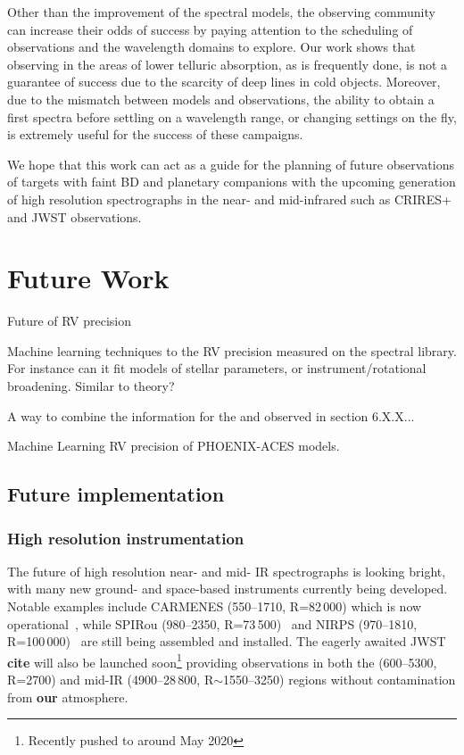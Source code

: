 Other than the improvement of the spectral models, the observing community can increase their odds of success by paying attention to the scheduling of observations and the wavelength domains to explore.
Our work shows that observing in the areas of lower telluric absorption, as is frequently done, is not a guarantee of success due to the scarcity of deep lines in cold objects.
Moreover, due to the mismatch between models and observations, the ability to obtain a first spectra before settling on a wavelength range, or changing settings on the fly, is extremely useful for the success of these campaigns.

We hope that this work can act as a guide for the planning of future observations of targets with faint {BD} and planetary companions with the upcoming generation of high resolution spectrographs in the near- and mid-infrared such as {CRIRES+} and JWST observations.





\section{Future Work}

Future of {RV} precision

Machine learning techniques to the RV precision measured on the spectral library.
For instance can it fit models of stellar parameters, or instrument/rotational broadening.
Similar to theory?


A way to combine the information for the \Logg{} and \feh{} observed in section 6.X.X...


Machine Learning RV precision of {PHOENIX-ACES} models.







\subsection{Future implementation}
\label{subsec:future}
\subsubsection{High resolution instrumentation}
\label{subsubsec:highres}
The future of high resolution near- and mid- IR spectrographs is looking bright, with many new ground- and space-based instruments currently being developed.
Notable examples include CARMENES (550--1710\nm{},  R=82\,000) which is now operational~\citep{quirrenbach_carmenes_2014}, while SPIRou (980--2350\nm{},  R=73\,500)~\cite{artigau_spirou_2014} and NIRPS (970--1810\nm{}, R=100\,000)~\citep{bouchy_nearinfrared_2017} are still being assembled and installed.
The eagerly awaited {JWST} \textbf{cite} will also be launched soon\footnote{Recently pushed to around May 2020} providing observations in both the \nir{} (600--5300\nm{}, R=2700) and mid-IR (4900--28\,800\nm{}, R$\sim$1550--3250) regions without contamination from \textbf{our} atmosphere.

